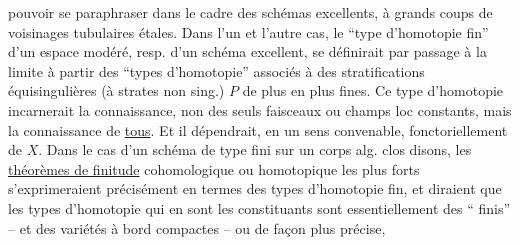 pouvoir se paraphraser dans le cadre des schémas excellents, à grands coups de voisinages tubulaires étales. Dans l'un et l'autre cas, le ``type d'homotopie fin'' d'un espace modéré, resp. d'un schéma excellent, se définirait par passage à la limite à partir des ``types d'homotopie'' associés à des stratifications équisingulières (à strates non sing.) $P$ de plus en plus fines. Ce type d'homotopie  incarnerait la connaissance, non des seuls faisceaux ou champs loc constants, mais  la connaissance de \uline{tous}. Et il dépendrait, en un sens convenable, fonctoriellement de $X$. Dans le cas d'un schéma de type fini sur un corps alg. clos disons, les \uline{théorèmes de finitude} cohomologique ou homotopique les plus forts s'exprimeraient précisément en termes des types d'homotopie fin, et diraient que les types d'homotopie  qui en sont les  constituants sont essentiellement des `` finis'' -- et  des variétés à bord compactes -- ou de façon plus précise,
